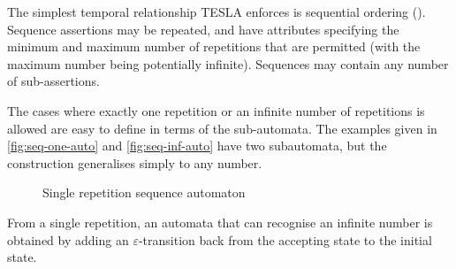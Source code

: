 The simplest temporal relationship TESLA enforces is sequential ordering
(). Sequence assertions
may be repeated, and have attributes specifying the minimum and maximum number
of repetitions that are permitted (with the maximum number being potentially
infinite). Sequences may contain any number of sub-assertions.

The cases where exactly one repetition or an infinite number of repetitions is
allowed are easy to define in terms of the sub-automata. The examples given in
\autoref{fig:seq-one-auto} and \autoref{fig:seq-inf-auto} have two subautomata,
but the construction generalises simply to any number.

\begin{figure}[ht]
  \centering
  \caption{Single repetition sequence automaton}
  \label{fig:seq-one-auto}
\end{figure}

From a single repetition, an automata that can recognise an infinite number is
obtained by adding an $\varepsilon$-transition back from the accepting state to
the initial state.

